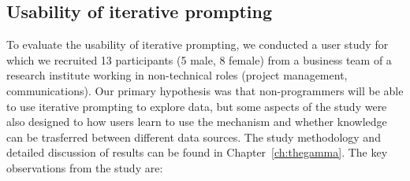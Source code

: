 \documentclass[fleqn,11pt]{report}
\theoremstyle{definition}
\begin{document}
\subsection{Usability of iterative prompting}

To evaluate the usability of iterative prompting, we conducted a user study for which we
recruited 13 participants (5 male, 8 female) from a business team of a research institute
working in non-technical roles (project management, communications).
Our primary hypothesis was that non-programmers will be able to use iterative prompting
to explore data, but some aspects of the study were also designed to how users learn to use
the mechanism and whether knowledge can be trasferred between different data sources.
The study methodology and detailed discussion of results can be found in Chapter~\ref{ch:thegamma}.
The key observations from the study are:
\end{document}
